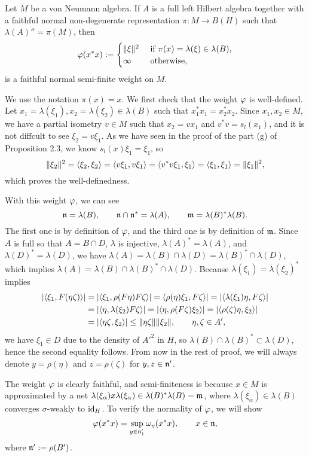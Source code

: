 \documentclass{../../small}
\begin{document}
\begin{thm}
Let $M$ be a von Neumann algebra.
If $A$ is a full left Hilbert algebra together with a faithful normal non-degenerate representation $\pi:M\to B(H)$ such that $\lambda(A)''=\pi(M)$, then
\[\varphi(x^*x):=\begin{cases}\|\xi\|^2&\text{ if }\pi(x)=\lambda(\xi)\in\lambda(B),\\\infty&\text{ otherwise},\end{cases}\]
is a faithful normal semi-finite weight on $M$.
\end{thm}
\begin{pf}
We use the notation $\pi(x)=x$.
We first check that the weight $\varphi$ is well-defined.
Let $x_1=\lambda(\xi_1),x_2=\lambda(\xi_2)\in\lambda(B)$ such that $x_1^*x_1=x_2^*x_2$.
Since $x_1,x_2\in M$, we have a partial isometry $v\in M$ such that $x_2=vx_1$ and $v^*v=s_l(x_1)$, and it is not diffcult to see $\xi_2=v\xi_1$.
As we have seen in the proof of the part (g) of Proposition 2.3, we know $s_l(x)\xi_1=\xi_1$, so
\[\|\xi_2\|^2=\langle\xi_2,\xi_2\rangle=\langle v\xi_1,v\xi_1\rangle=\langle v^*v\xi_1,\xi_1\rangle=\langle\xi_1,\xi_1\rangle=\|\xi_1\|^2,\]
which proves the well-definedness.

With this weight $\varphi$, we can see
\[\mathfrak{n}=\lambda(B),\qquad\mathfrak{n}\cap\mathfrak{n}^*=\lambda(A),\qquad\mathfrak{m}=\lambda(B)^*\lambda(B).\]
The first one is by definition of $\varphi$, and the third one is by definition of $\mathfrak{m}$.
Since $A$ is full so that $A=B\cap D$, $\lambda$ is injective, $\lambda(A)^*=\lambda(A)$, and $\lambda(D)^*=\lambda(D)$, we have $\lambda(A)=\lambda(B)\cap\lambda(D)=\lambda(B)^*\cap\lambda(D)$, which implies $\lambda(A)=\lambda(B)\cap\lambda(B)^*\cap\lambda(D)$.
Because $\lambda(\xi_1)=\lambda(\xi_2)^*$ implies
\begin{align*}
|\langle\xi_1,F(\eta\zeta)\rangle|
&=|\langle\xi_1,\rho(F\eta)F\zeta\rangle|=\langle\rho(\eta)\xi_1,F\zeta\rangle|=|\langle\lambda(\xi_1)\eta,F\zeta\rangle|\\
&=|\langle\eta,\lambda(\xi_2)F\zeta\rangle|=|\langle\eta,\rho(F\zeta)\xi_2\rangle|=|\langle\rho(\zeta)\eta,\xi_2\rangle|\\
&=|\langle\eta\zeta,\xi_2\rangle|\le\|\eta\zeta\|\|\xi_2\|,\qquad\eta,\zeta\in A',
\end{align*}
we have $\xi_1\in D$ due to the density of $A'^2$ in $H$, so $\lambda(B)\cap\lambda(B)^*\subset\lambda(D)$, hence the second equality follows.
From now in the rest of proof, we will always denote $y=\rho(\eta)$ and $z=\rho(\zeta)$ for $y,z\in\mathfrak{n}'$.

The weight $\varphi$ is clearly faithful, and semi-finiteness is because $x\in M$ is approximated by a net $\lambda(\xi_\alpha)x\lambda(\xi_\alpha)\in\lambda(B)^*\lambda(B)=\mathfrak{m}$, where $\lambda(\xi_\alpha)\in\lambda(B)$ converges $\sigma$-weakly to $\operatorname{id}_H$.
To verify the normality of $\varphi$, we will show
\[\varphi(x^*x)=\sup_{y\in\mathfrak{n}'_1}\omega_{\eta}(x^*x),\qquad x\in\mathfrak{n},\]
where $\mathfrak{n}':=\rho(B')$.


\end{pf}
\end{document}
